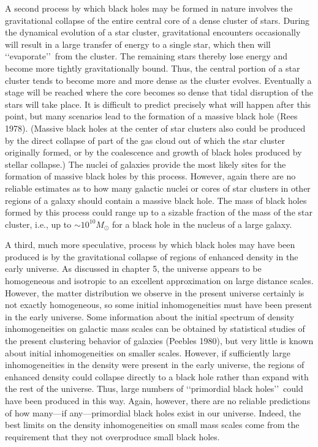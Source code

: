 A second process by which black holes may be formed in nature involves the
gravitational collapse of the entire central core of a dense cluster of stars. During the
dynamical evolution of a star cluster, gravitational encounters occasionally will
result in a large transfer of energy to a single star, which then will \lq\lq evaporate\rq\rq\
from the cluster. The remaining stars thereby lose energy and become more tightly
gravitationally bound. Thus, the central portion of a star cluster tends to become more
and more dense as the cluster evolves. Eventually a stage will be reached where the
core becomes so dense that tidal disruption of the stars will take place. It is difficult
to predict precisely what will happen after this point, but many scenarios lead to the
formation of a massive black hole (Rees 1978). (Massive black holes at the center of
star clusters also could be produced by the direct collapse of part of the gas cloud
out of which the star cluster originally formed, or by the coalescence and growth of
black holes produced by stellar collapse.) The nuclei of galaxies provide the most
likely sites for the formation of massive black holes by this process. However, again
there are no reliable estimates as to how many galactic nuclei or cores of star clusters
in other regions of a galaxy should contain a massive black hole. The mass of black
holes formed by this process could range up to a sizable fraction of the mass of the
star cluster, i.e., up to \(\sim10^{10}M_\odot\) for a black hole in the nucleus of a
large galaxy.

A third, much more speculative, process by which black holes may have been
produced is by the gravitational collapse of regions of enhanced density in the early
universe. As discussed in chapter 5, the universe appears to be homogeneous and
isotropic to an excellent approximation on large distance scales. However, the matter
distribution we observe in the present universe certainly is not exactly homogeneous,
so some initial inhomogeneities must have been present in the early universe. Some
information about the initial spectrum of density inhomogeneities on galactic mass
scales can be obtained by statistical studies of the present clustering behavior of
galaxies (Peebles 1980), but very little is known about initial inhomogeneities on
smaller scales. However, if sufficiently large inhomogeneities in the density were
present in the early universe, the regions of enhanced density could collapse directly
to a black hole rather than expand with the rest of the universe. Thus, large numbers
of \lq\lq primordial black holes\rq\rq\ could have been produced in this way. Again,
however, there are no reliable predictions of how many---if any---primordial black
holes exist in our universe. Indeed, the best limits on the density inhomogeneities on
small mass scales come from the requirement that they not overproduce small black
holes.

